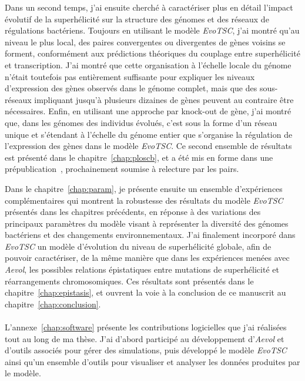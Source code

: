 Dans un second temps, j'ai ensuite cherché à caractériser plus en détail l'impact évolutif de la superhélicité sur la structure des génomes et des réseaux de régulations bactériens.
Toujours en utilisant le modèle \emph{EvoTSC}, j'ai montré qu'au niveau le plus local, des paires convergentes ou divergentes de gènes voisins se forment, conformément aux prédictions théoriques du couplage entre superhélicité et transcription.
J'ai montré que cette organisation à l'échelle locale du génome n'était toutefois pas entièrement suffisante pour expliquer les niveaux d'expression des gènes observés dans le génome complet, mais que des sous-réseaux impliquant jusqu'à plusieurs dizaines de gènes peuvent au contraire être nécessaires.
Enfin, en utilisant une approche par knock-out de gène, j'ai montré que, dans les génomes des individus évolués, c'est sous la forme d'un réseau unique et s'étendant à l'échelle du génome entier que s'organise la régulation de l'expression des gènes dans le modèle \emph{EvoTSC}.
Ce second ensemble de résultats est présenté dans le chapitre~\ref{chap:ploscb}, et a été mis en forme dans une prépublication~\citep{grohens2022b}, prochainement soumise à relecture par les pairs.

Dans le chapitre~\ref{chap:param}, je présente ensuite un ensemble d'expériences complémentaires qui montrent la robustesse des résultats du modèle \emph{EvoTSC} présentés dans les chapitres précédents, en réponse à des variations des principaux paramètres du modèle visant à représenter la diversité des génomes bactériens et des changements environnementaux.
J'ai finalement incorporé dans \emph{EvoTSC} un modèle d'évolution du niveau de superhélicité globale, afin de pouvoir caractériser, de la même manière que dans les expériences menées avec \emph{Aevol}, les possibles relations épistatiques entre mutations de superhélicité et réarrangements chromosomiques.
Ces résultats sont présentés dans le chapitre~\ref{chap:epistasis}, et ouvrent la voie à la conclusion de ce manuscrit au chapitre~\ref{chap:conclusion}.

\paragraph{}
L'annexe~\ref{chap:software} présente les contributions logicielles que j'ai réalisées tout au long de ma thèse.
J'ai d'abord participé au développement d'\emph{Aevol} et d'outils associés pour gérer des simulations, puis développé le modèle \emph{EvoTSC} ainsi qu'un ensemble d'outils pour visualiser et analyser les données produites par le modèle.

